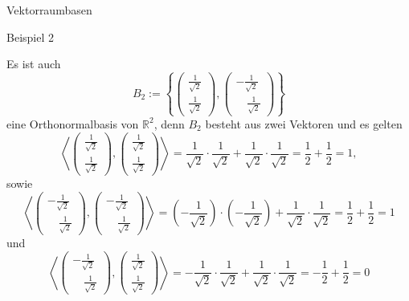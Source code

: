 \documentclass[
  8pt,
  ignorenonframetext,
]{beamer}
\begin{document}
\begin{frame}{Vektorraumbasen}
\protect\hypertarget{vektorraumbasen-7}{}
\small

Beispiel 2 

\footnotesize

Es ist auch \begin{equation}
B_2 :=
\left\lbrace
\begin{pmatrix}
\frac{1}{\sqrt{2}} \\ \frac{1}{\sqrt{2}}
\end{pmatrix},
\begin{pmatrix}
- \frac{1}{\sqrt{2}} \\ \quad \frac{1}{\sqrt{2}}
\end{pmatrix}
\right\rbrace
\end{equation} eine Orthonormalbasis von \(\mathbb{R}^2\), denn \(B_2\)
besteht aus zwei Vektoren und es gelten \begin{equation}
\left \langle
\begin{pmatrix}
\frac{1}{\sqrt{2}} \\ \frac{1}{\sqrt{2}}
\end{pmatrix},
\begin{pmatrix}
\frac{1}{\sqrt{2}} \\ \frac{1}{\sqrt{2}}
\end{pmatrix}
\right \rangle
= \frac{1}{\sqrt{2}} \cdot \frac{1}{\sqrt{2}}
+ \frac{1}{\sqrt{2}} \cdot \frac{1}{\sqrt{2}}
= \frac{1}{2} + \frac{1}{2}
= 1,
\end{equation} sowie \begin{equation}
\left \langle
\begin{pmatrix}
- \frac{1}{\sqrt{2}} \\ \quad \frac{1}{\sqrt{2}}
\end{pmatrix},
\begin{pmatrix}
- \frac{1}{\sqrt{2}} \\ \quad \frac{1}{\sqrt{2}}
\end{pmatrix}
\right \rangle
= \left(- \frac{1}{\sqrt{2}} \right)\cdot \left(- \frac{1}{\sqrt{2}} \right)
+ \frac{1}{\sqrt{2}} \cdot \frac{1}{\sqrt{2}}
= \frac{1}{2} + \frac{1}{2}
= 1
\end{equation} und \begin{equation}
\left \langle
\begin{pmatrix}
- \frac{1}{\sqrt{2}} \\ \quad \frac{1}{\sqrt{2}}
\end{pmatrix},
\begin{pmatrix}
  \frac{1}{\sqrt{2}} \\  \frac{1}{\sqrt{2}}
\end{pmatrix}
\right \rangle
= - \frac{1}{\sqrt{2}} \cdot \frac{1}{\sqrt{2}}
  + \frac{1}{\sqrt{2}}   \cdot \frac{1}{\sqrt{2}}
= - \frac{1}{2} + \frac{1}{2}
= 0
\end{equation}
\end{frame}
\end{document}
